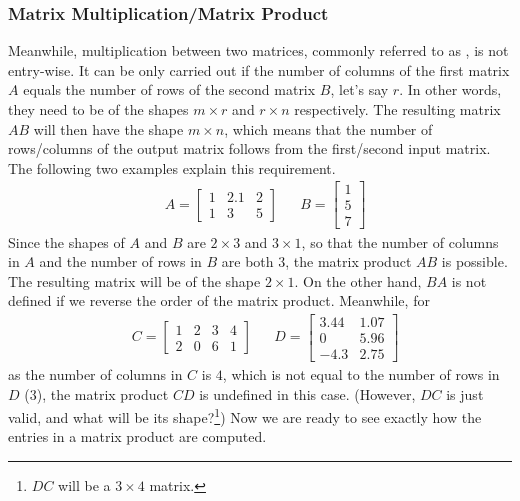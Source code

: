 \subsubsection{Matrix Multiplication/Matrix Product} Meanwhile, multiplication between two matrices, commonly referred to as , is not entry-wise. It can be only carried out if the number of columns of the first matrix $A$ equals the number of rows of the second matrix $B$, let's say $r$. In other words, they need to be of the shapes $m \times r$ and $r \times n$ respectively. The resulting matrix $AB$ will then have the shape $m \times n$, which means that the number of rows/columns of the output matrix follows from the first/second input matrix. The following two examples explain this requirement.
\begin{align*}
& A = 
\begin{bmatrix}
1 & 2.1 & 2 \\
1 & 3 & 5
\end{bmatrix} &
& B = 
\begin{bmatrix}
1 \\
5 \\
7
\end{bmatrix}
\end{align*}
Since the shapes of $A$ and $B$ are $2 \times 3$ and $3 \times 1$, so that the number of columns in $A$ and the number of rows in $B$ are both $3$, the matrix product $AB$ is possible. The resulting matrix will be of the shape $2 \times 1$. On the other hand, $BA$ is not defined if we reverse the order of the matrix product. Meanwhile, for
\begin{align*}
& C = 
\begin{bmatrix}
1 & 2 & 3 & 4 \\
2 & 0 & 6 & 1
\end{bmatrix} &
& D = 
\begin{bmatrix}
3.44 & 1.07\\
0 & 5.96\\
-4.3 & 2.75
\end{bmatrix}
\end{align*}
as the number of columns in $C$ is $4$, which is not equal to the number of rows in $D$ ($3$), the matrix product $CD$ is undefined in this case. (However, $DC$ is just valid, and what will be its shape?\footnote{$DC$ will be a $3 \times 4$ matrix.}) Now we are ready to see exactly how the entries in a matrix product are computed.


